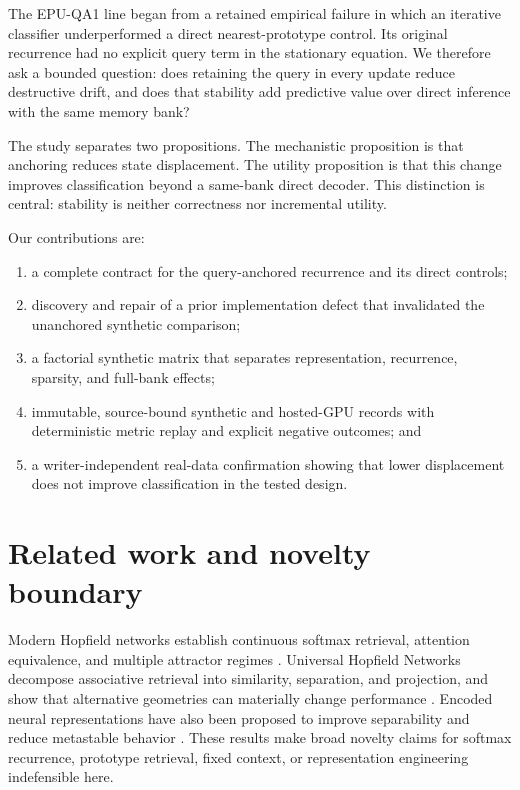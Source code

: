\documentclass[11pt]{article}
\begin{document}
The EPU-QA1 line began from a retained empirical failure in which an iterative classifier underperformed a direct nearest-prototype control. Its original recurrence had no explicit query term in the stationary equation. We therefore ask a bounded question: does retaining the query in every update reduce destructive drift, and does that stability add predictive value over direct inference with the same memory bank?

The study separates two propositions. The mechanistic proposition is that anchoring reduces state displacement. The utility proposition is that this change improves classification beyond a same-bank direct decoder. This distinction is central: stability is neither correctness nor incremental utility.

Our contributions are:
\begin{enumerate}
  \item a complete contract for the query-anchored recurrence and its direct controls;
  \item discovery and repair of a prior implementation defect that invalidated the unanchored synthetic comparison;
  \item a factorial synthetic matrix that separates representation, recurrence, sparsity, and full-bank effects;
  \item immutable, source-bound synthetic and hosted-GPU records with deterministic metric replay and explicit negative outcomes; and
  \item a writer-independent real-data confirmation showing that lower displacement does not improve classification in the tested design.
\end{enumerate}

\section{Related work and novelty boundary}
Modern Hopfield networks establish continuous softmax retrieval, attention equivalence, and multiple attractor regimes \cite{ramsauer2020}. Universal Hopfield Networks decompose associative retrieval into similarity, separation, and projection, and show that alternative geometries can materially change performance \cite{millidge2022}. Encoded neural representations have also been proposed to improve separability and reduce metastable behavior \cite{kashyap2024}. These results make broad novelty claims for softmax recurrence, prototype retrieval, fixed context, or representation engineering indefensible here.
\end{document}
